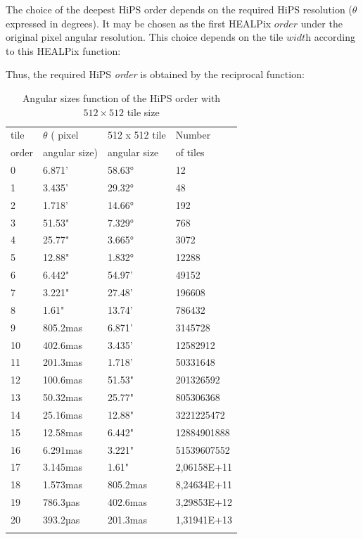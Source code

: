\documentclass[11pt,a4paper]{ivoa}
\begin{document}
The choice of the deepest HiPS order depends on the required HiPS resolution ($\theta$ expressed  in degrees). It may be chosen as the first HEALPix $\textit{order}$ under the original pixel angular resolution. This choice depends on the tile $\textit{width}$ according to this HEALPix function: 


\medskip
\noindent{}
\medskip

Thus, the required HiPS \textit{order} is obtained by the reciprocal function:\\
\medskip
\noindent{}
\medskip



\begin{longtable}{|l|l|l|l|}
\hline

tile                  & $\theta$ ( pixel          & 512 x 512 tile  & Number  \\ 
order              &  angular size)             & angular size    & of tiles           \\ \hline

0 & 6.871' & 58.63° & 12 \\ \hline
1 & 3.435' & 29.32° & 48 \\ \hline
2 & 1.718' & 14.66° & 192 \\ \hline
3 & 51.53" & 7.329° & 768 \\ \hline
4 & 25.77" & 3.665° & 3072 \\ \hline
5 & 12.88" & 1.832° & 12288 \\ \hline
6 & 6.442" & 54.97' & 49152 \\ \hline
7 & 3.221" & 27.48' & 196608 \\ \hline
8 & 1.61" & 13.74' & 786432 \\ \hline
9 & 805.2mas & 6.871' & 3145728 \\ \hline
10 & 402.6mas & 3.435' & 12582912 \\ \hline
11 & 201.3mas & 1.718' & 50331648 \\ \hline
12 & 100.6mas & 51.53" & 201326592 \\ \hline
13 & 50.32mas & 25.77" & 805306368 \\ \hline
14 & 25.16mas & 12.88" & 3221225472 \\ \hline
15 & 12.58mas & 6.442" & 12884901888 \\ \hline
16 & 6.291mas & 3.221" & 51539607552 \\ \hline
17 & 3.145mas & 1.61" & 2,06158E+11 \\ \hline
18 & 1.573mas & 805.2mas & 8,24634E+11 \\ \hline
19 & 786.3µas & 402.6mas & 3,29853E+12 \\ \hline
20 & 393.2µas & 201.3mas & 1,31941E+13 \\ \hline

\caption{Angular sizes function of the HiPS order with $512 \times 512$ tile size}
\label{tab:tabOrder}
\end{longtable}
\end{document}
